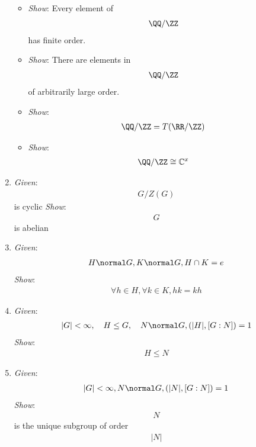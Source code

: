 \begin{enumerate}
  \begin{itemize}
  \tightlist
  \item
    \emph{Show}: Every element of \begin{align*}
    \QQ/\ZZ\end{align*}
     has finite order.
  \item
    \emph{Show}: There are elements in \begin{align*}
    \QQ/\ZZ\end{align*}
     of arbitrarily large order.
  \item
    \emph{Show}: \begin{align*}
    \QQ/\ZZ = T(\RR/\ZZ)\end{align*}
  \item
    \emph{Show}: \begin{align*}
    \QQ/\ZZ \cong \mathbb{C}^x\end{align*}
  \end{itemize}
\item
  \emph{Given}: \begin{align*}
  G/Z(G)\end{align*}
   is cyclic \emph{Show}: \begin{align*}
  G\end{align*}
   is abelian
\item
  \emph{Given}: \begin{align*}
  H \normal G, K \normal G,H \cap K = e\end{align*}
   \emph{Show}: \begin{align*}
  \forall h\in H, \forall k\in K, hk = kh\end{align*}
\item
  \emph{Given}: \begin{align*}
  |G| < \infty, \quad H \leq G, \quad N \normal G, (|H|, [G:N]) = 1\end{align*}
   \emph{Show}: \begin{align*}
  H \leq N\end{align*}
\item
  \emph{Given}: \begin{align*}
  |G| < \infty, N \normal G, (|N|, [G:N]) =1\end{align*}
   \emph{Show}: \begin{align*}
  N\end{align*}
   is the unique subgroup of order \begin{align*}
  |N|\end{align*}
\end{enumerate}

